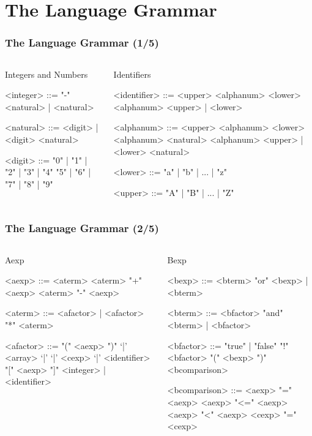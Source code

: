 \documentclass{beamer}
\begin{document}
\section{The Language Grammar}
\begin{frame}[fragile]
\footnotesize
\frametitle{The Language Grammar (1/5)}
\begin{columns}
\begin{block}{Integers and Numbers}
\begin{grammar}
	<integer> ::= "-" <natural> | <natural>

	<natural> ::= <digit> | <digit> <natural>

	<digit> ::= "0" | "1" | "2" | "3" | "4"
	\alt "5" | "6" | "7" | "8" | "9"
\end{grammar}
\end{block}
\begin{block}{Identifiers}
\begin{grammar}
	<identifier> ::= <upper> <alphanum>
	\alt <lower> <alphanum>
	\alt <upper> | <lower> 
	
	<alphanum> ::= <upper> <alphanum>
	\alt <lower> <alphanum>
	\alt <natural> <alphanum>
	\alt <upper> | <lower>
	\alt <natural>

	<lower> ::= "a" | "b" | ... | "z"

	<upper> ::= "A" | "B" | ... | "Z"
\end{grammar}
\end{block}
\end{columns}
\end{frame}

\begin{frame}[fragile]
	\footnotesize
	\frametitle{The Language Grammar (2/5)}
	\begin{columns}
		\begin{block}{Aexp}
			\begin{grammar}
				<aexp> ::= <aterm>
				\alt <aterm> "+" <aexp>
				\alt <aterm> "-" <aexp>

				<aterm> ::= <afactor> | <afactor> "*" <aterm>

				<afactor> ::= "(" <aexp> ")"
				\alt `|' <array> `|'
				\alt `|' <cexp> `|'
				 "[" <aexp> "]"
				\alt <integer> | <identifier>
			\end{grammar}
		\end{block}
		\column{0.45\textwidth}
		\begin{block}{Bexp}
			\begin{grammar}
				<bexp> ::= <bterm> "or" <bexp> | <bterm>

				<bterm> ::= <bfactor> "and" <bterm> | <bfactor>

				<bfactor> ::= "true" | "false"
				\alt "!" <bfactor>
				\alt "(" <bexp> ")"
				\alt <bcomparison>

				<bcomparison> ::= <aexp> "=" <aexp>
				\alt <aexp> "<=" <aexp>
				\alt <aexp> "<" <aexp>
				\alt <cexp> "=" <cexp>
			\end{grammar}
		\end{block}
	\end{columns}
\end{frame}
\end{document}
